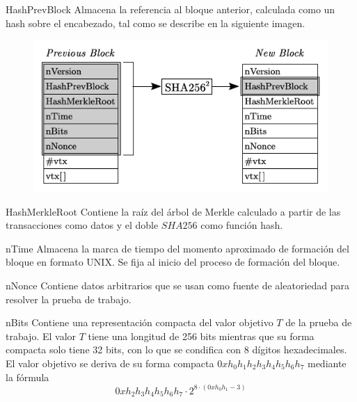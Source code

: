 \documentclass{beamer}
\theoremstyle{definition}
\begin{document}
\begin{frame}
\begin{block}{HashPrevBlock}
	Almacena la referencia al bloque anterior, calculada como un hash sobre el encabezado, tal como se describe en la siguiente imagen.
	\begin{figure}[h!]
		\includegraphics[scale=0.5]{referencia}
	\end{figure}
\end{block}
\end{frame}



\begin{frame}
	\begin{block}{HashMerkleRoot}
		Contiene la raíz del árbol de Merkle calculado a partir de las transacciones como datos y el doble $SHA256$ como función hash. 
	\end{block}\pause
\begin{block}{nTime}
	Almacena la marca de tiempo del momento aproximado de formación del bloque en formato UNIX. Se fija al inicio del proceso de formación del bloque.
\end{block}\pause
\begin{block}{nNonce}
	Contiene datos arbitrarios que se usan como fuente de aleatoriedad para resolver la prueba de trabajo.
\end{block}
\end{frame}

\begin{frame}
	\begin{block}{nBits}
		Contiene una representación compacta del valor objetivo $T$ de la prueba de trabajo. El valor $T$ tiene una longitud de 256 bits mientras que su forma compacta solo tiene 32 bits, con lo que se condifica con 8 dígitos hexadecimales. El valor objetivo se deriva de su forma compacta $0xh_0 h_1 h_2 h_3 h_4 h_5 h_6 h_7$ mediante la fórmula
		$$0xh_2h_3h_4h_5h_6h_7 \cdot 2^{8\cdot(0xh_0h_1-3)}$$
	\end{block}
\end{frame}
\end{document}
